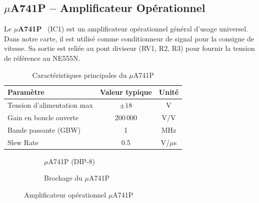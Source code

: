 \documentclass[a4paper,12pt,openany]{book}
\begin{document}
\subsection{$\mu$A741P -- Amplificateur Op\'erationnel}

Le \textbf{$\mu$A741P}~\cite{UA741DS} (IC1) est un amplificateur
op\'erationnel g\'en\'eral d'usage universel. Dans notre carte, il est
utilis\'e comme conditionneur de signal pour la consigne de vitesse.
Sa sortie est reli\'ee au pont diviseur (RV1, R2, R3) pour fournir la
tension de r\'ef\'erence au NE555N.

\begin{table}[H]
  \centering
  \caption{Caract\'eristiques principales du $\mu$A741P}
  \begin{tabular}{|l|c|c|}
    \hline
    \textbf{Param\`etre} & \textbf{Valeur typique} & \textbf{Unit\'e} \\
    \hline
    Tension d'alimentation max  & $\pm18$  & V      \\
    Gain en boucle ouverte      & 200\,000 & V/V    \\
    Bande passante (GBW)        & 1        & MHz    \\
    Slew Rate                   & 0.5      & V/$\mu$s \\
    \hline
  \end{tabular}
  \label{tab:ua741}
\end{table}

\begin{figure}[H]
  \centering
  \begin{subfigure}[b]{0.45\textwidth}
    \centering
    \caption{$\mu$A741P (DIP-8)}
  \end{subfigure}
  \hfill
  \begin{subfigure}[b]{0.50\textwidth}
    \centering
    \caption{Brochage du $\mu$A741P}
  \end{subfigure}
  \caption{Amplificateur op\'erationnel $\mu$A741P}
  \label{fig:ua741}
\end{figure}
\end{document}
